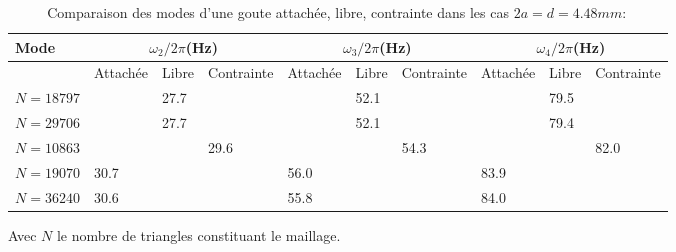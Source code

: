 \documentclass[a4paper]{report}
\begin{document}
\begin{table}[htp]
\begin{center}
    \begin{tabular}{ | l || l | l | l || l | l | l || l | l | l || }
    \hline
    Mode          &\multicolumn{3}{c||}{$\omega_2/2\pi$(Hz)} & \multicolumn{3}{c||}{$\omega_3/2\pi$(Hz)} & \multicolumn{3}{c||}{$\omega_4/2\pi$(Hz)} \\
    \hline
                  & Attachée & Libre & Contrainte & Attachée & Libre & Contrainte & Attachée & Libre & Contrainte \\
    \hline
    $N = 18797$   &          & 27.7  &            &          & 52.1  &            &          &79.5   &            \\
    \hline
    $N = 29706$   &          & 27.7  &            &          & 52.1  &            &          &79.4   &            \\
    \hline
    $N = 10863$   &          &       & 29.6       &          &       & 54.3       &          &       & 82.0       \\
    \hline
    $N = 19070$   & 30.7     &       &            & 56.0     &       &            & 83.9     &       &            \\
    \hline
    $N = 36240$   & 30.6     &       &            & 55.8     &       &            & 84.0     &       &            \\
    \hline
    \end{tabular}
\end{center}
\caption{Comparaison des modes d'une goute attachée, libre, contrainte dans les cas $2a = d = 4.48 mm :$}
\end{table}



Avec $N$ le nombre de triangles constituant le maillage.
\end{document}

